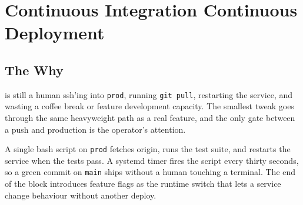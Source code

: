 
\chapter{Continuous Integration Continuous Deployment}


\section{The Why}


 is still a human ssh'ing into \texttt{prod}, running
\texttt{git pull}, restarting the service, and wasting a coffee break or 
feature development capacity.
The smallest tweak goes through the same heavyweight path as a real
feature, and the only gate between a push and production is the
operator's attention.

A single bash script on \texttt{prod} fetches origin, runs the test
suite, and restarts the service when the tests pass.
A systemd timer fires the script every thirty seconds, so a green
commit on \texttt{main} ships without a human touching a terminal.
The end of the block introduces feature flags as the runtime switch
that lets a service change behaviour without another deploy.

